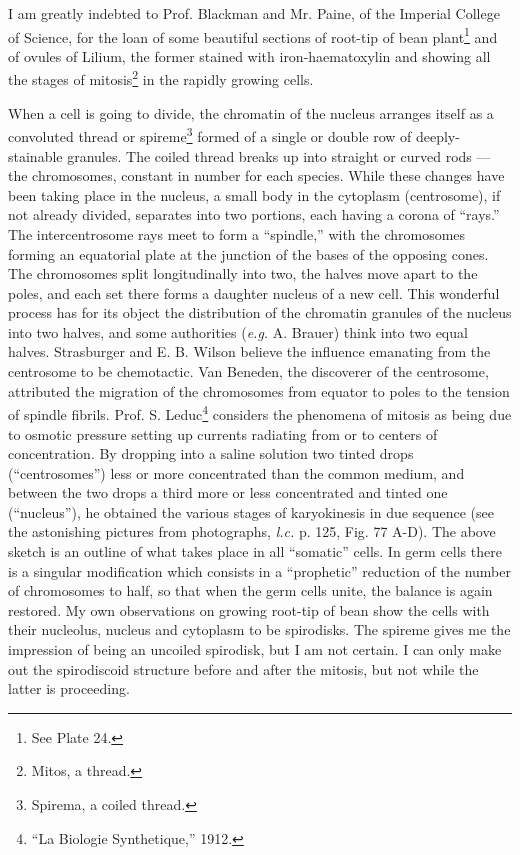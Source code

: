 \documentclass[a4paper, 12pt, oneside, landscape]{article}
\begin{document}
I am greatly indebted to Prof. Blackman and Mr. Paine, of the Imperial College of Science, for the loan of some beautiful sections of root-tip of bean plant\footnote{See Plate 24.} and of ovules of Lilium, the former stained with iron-haematoxylin and showing all the stages of mitosis\footnote{Mitos, a thread.} in the rapidly growing cells.

When a cell is going to divide, the chromatin of the nucleus arranges itself as a convoluted thread or spireme\footnote{Spirema, a coiled thread.} formed of a single or double row of deeply-stainable granules. The coiled thread breaks up into straight or curved rods --- the chromosomes, constant in number for each species. While these changes have been taking place in the nucleus, a small body in the cytoplasm (centrosome), if not already divided, separates into two portions, each having a corona of ``rays.'' The intercentrosome rays meet to form a ``spindle,'' with the chromosomes forming an equatorial plate at the junction of the bases of the opposing cones. The chromosomes split longitudinally into two, the halves move apart to the poles, and each set there forms a daughter nucleus of a new cell. This wonderful process has for its object the distribution of the chromatin granules of the nucleus into two halves, and some authorities (\emph{e.g.} A. Brauer) think into two equal halves. Strasburger and E. B. Wilson believe the influence emanating from the centrosome to be chemotactic. Van Beneden, the discoverer of the centrosome, attributed the migration of the chromosomes from equator to poles to the tension of spindle fibrils. Prof. S. Leduc\footnote{``La Biologie Synthetique,'' 1912.} considers the phenomena of mitosis as being due to osmotic pressure setting up currents radiating from or to centers of concentration. By dropping into a saline solution two tinted drops (``centrosomes'') less or more concentrated than the common medium, and between the two drops a third more or less concentrated and tinted one (``nucleus''), he obtained the various stages of karyokinesis in due sequence (see the astonishing pictures from photographs, \emph{l.c.} p. 125, Fig. 77 A-D). The above sketch is an outline of what takes place in all ``somatic'' cells. In germ cells there is a singular modification which consists in a ``prophetic'' reduction of the number of chromosomes to half, so that when the germ cells unite, the balance is again restored. My own observations on growing root-tip of bean show the cells with their nucleolus, nucleus and cytoplasm to be spirodisks. The spireme gives me the impression of being an uncoiled spirodisk, but I am not certain. I can only make out the spirodiscoid structure before and after the mitosis, but not while the latter is proceeding.
\end{document}
